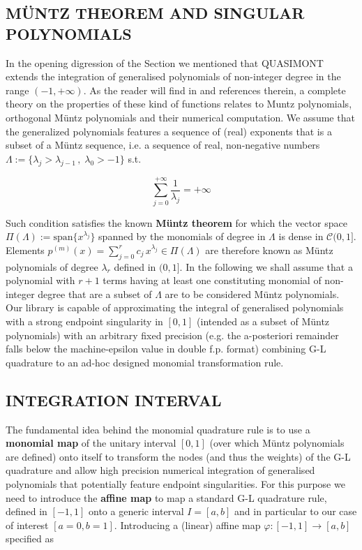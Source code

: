 \documentclass[a4paper, twosided]{book}
\begin{document}
\subsection[Müntz theorem and singular polynomials]{\changefont MÜNTZ THEOREM AND SINGULAR POLYNOMIALS }\label{SubSec1.2.4}

In the opening digression of the Section we mentioned that QUASIMONT extends the integration of generalised polynomials of non-integer degree in the range $(-1,+\infty)$. As the reader will find in \cite{Lombardi09} and references therein, a complete theory on the properties of these kind of functions relates to Muntz polynomials, orthogonal Müntz polynomials and their numerical computation. We assume that the generalized polynomials features a sequence of (real) exponents that is a subset of a Müntz sequence, i.e. a sequence of real, non-negative numbers $\Lambda:=\{\lambda_j>\lambda_{j-1}\,,\;\lambda_0>-1\}$ s.t.

\begin{equation}\label{eq1.9}
    \sum_{j=0}^{+\infty}\frac{1}{\lambda_j}=+\infty
\end{equation}

\noindent
Such condition satisfies the known \color{poliDarkBlue} \textbf{Müntz theorem} \color{black} for which the vector space $\Pi(\Lambda):=\text{span}\{x^{\lambda_j}\}$ spanned by the monomials of degree in $\Lambda$ is dense in $\mathcal{C}(0,1]$. Elements $p^{(m)}(x) = \sum_{j=0}^{r} c_j\,x^{\lambda_j}\in\Pi(\Lambda)$ are therefore known as Müntz polynomials of degree $\lambda_r$ defined in $(0,1]$. In the following we shall assume that a polynomial with $r+1$ terms having at least one constituting monomial of non-integer degree that are a subset of $\Lambda$ are to be considered Müntz polynomials. Our library is capable of approximating the integral of generalised polynomials with a strong endpoint singularity in $[0,1]$ (intended as a subset of Müntz polynomials) with an arbitrary fixed precision (e.g. the a-posteriori remainder falls below the machine-epsilon value in double f.p. format) combining G-L quadrature to an ad-hoc designed monomial transformation rule.

\subsection[Integration interval]{\changefont INTEGRATION INTERVAL}\label{SubSec1.2.5}

The fundamental idea behind the monomial quadrature rule is to use a \color{poliDarkBlue} \textbf{monomial map} \color{black}  of the unitary interval $[0,1]$ (over which Müntz polynomials are defined) onto itself to transform the nodes (and thus the weights) of the G-L quadrature and allow high precision numerical integration of generalised polynomials that potentially feature endpoint singularities. For this purpose we need to introduce the \color{poliDarkBlue} \textbf{affine map} \color{black} to map a standard G-L quadrature rule, defined in $[-1,1]$ onto a  generic interval $I=[a,b]$ and in particular to our case of interest $[a=0, b=1]$.
Introducing a (linear) affine map $\varphi:[-1,1]\to[a,b]$ specified as
\end{document}
